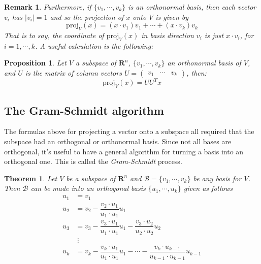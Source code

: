 \documentclass[12pt]{article}
\numberwithin{equation}{subsection}
\numberwithin{figure}{subsection}
\newtheorem{thm}[subsection]{Theorem}
\newtheorem{prop}[subsection]{Proposition}
\theoremstyle{note}
\newtheorem{remark}[subsection]{Remark}
\newcommand{\R}{\mathbf{R}}
\newcommand\m[1]{\begin{pmatrix}#1\end{pmatrix}}
\newcommand\proj[2]{\mathrm{proj}_{#1}(#2)}
\begin{document}
\begin{remark}Furthermore, if $\{v_1,\cdots,v_k\}$ is an ortho\textit{normal} basis, then each vector $v_i$ has $|v_i|=1$ and so %
the projection of $x$ onto $V$ is given by \begin{equation} 
		\proj{V}{x}=(x\cdot v_1)v_1+\cdots+(x\cdot v_k)v_k\end{equation}
That is to say, the coordinate of $\proj{V}{x}$ in basis direction $v_i$ is just $x\cdot v_i$, for $i=1,\cdots,k$. A useful calculation is the following:
\end{remark}
\begin{prop}
\label{prop-proj}
Let $V$ a subspace of $\R^n$, $\{v_1,\cdots,v_k\}$ an orthonormal basis of $V$, and $U$ is the matrix of column vectors $U=\m{v_1 & \cdots & v_k}$, then: \begin{equation}
		\proj{V}{x}=UU^Tx
	\end{equation}
\end{prop}

\subsection{The Gram-Schmidt algorithm}
The formulas above for projecting a vector onto a subspace all required that the subspace had an orthogonal or orthonormal basis. Since not all bases are orthogonal, it's useful to have a general algorithm for turning a basis into an orthogonal one. This is called the \textit{Gram-Schmidt} process.

\begin{thm}Let $V$ be a subspace of $\R^n$ and $\mathcal{B}=\{v_1,\cdots,v_k\}$ be \textit{any} basis for $V$. Then $\mathcal{B}$ can be made into an orthogonal basis $\{u_1,\cdots,u_k\}$ given as follows
\begin{align}
	u_1 &= v_1 \nonumber \\
	u_2 &= v_2- \dfrac{v_2\cdot u_1}{u_1\cdot u_1}u_1 \nonumber\\
	u_3 &= v_3 -\dfrac{v_3\cdot u_1}{u_1\cdot u_1}u_1-\dfrac{v_3\cdot u_2}{u_2\cdot u_2}u_2 \nonumber \\
	& \;\vdots \nonumber\\
	u_k &= v_k -  \dfrac{v_k\cdot u_1}{u_1\cdot u_1}u_1 - \cdots - \dfrac{v_k\cdot u_{k-1}}{u_{k-1}\cdot u_{k-1}}u_{k-1} 
\end{align}
\end{thm}
\end{document}
